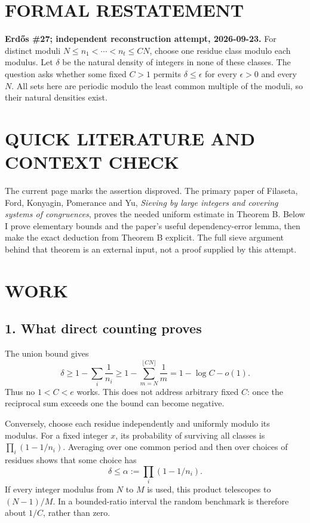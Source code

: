 \section{FORMAL RESTATEMENT}
\textbf{Erd\H{o}s \#27; independent reconstruction attempt, 2026-09-23.}
For distinct moduli $N\leq n_1<\cdots<n_t\leq CN$, choose one residue
class modulo each modulus. Let $\delta$ be the natural density of integers
in none of these classes. The question asks whether some fixed $C>1$
permits $\delta\leq\epsilon$ for every $\epsilon>0$ and every $N$.
All sets here are periodic modulo the least common multiple of the
moduli, so their natural densities exist.

\section{QUICK LITERATURE AND CONTEXT CHECK}
The current page marks the assertion disproved. The primary paper of
Filaseta, Ford, Konyagin, Pomerance and Yu, \emph{Sieving by large
integers and covering systems of congruences}, proves the needed
uniform estimate in Theorem B. Below I prove elementary bounds and the
paper's useful dependency-error lemma, then make the exact deduction
from Theorem B explicit. The full sieve argument behind that theorem
is an external input, not a proof supplied by this attempt.

\section{WORK}
\subsection{1. What direct counting proves}
The union bound gives
\[
 \delta\geq1-\sum_i\frac1{n_i}
 \geq1-\sum_{m=N}^{\lfloor CN\rfloor}\frac1m
 =1-\log C-o(1).
\]
Thus no $1<C<e$ works. This does not address arbitrary fixed $C$:
once the reciprocal sum exceeds one the bound can become negative.

Conversely, choose each residue independently and uniformly modulo its
modulus. For a fixed integer $x$, its probability of surviving all
classes is $\prod_i(1-1/n_i)$. Averaging over one common period and then
over choices of residues shows that some choice has
\[
 \delta\leq\alpha:=\prod_i(1-1/n_i).
\]
If every integer modulus from $N$ to $M$ is used, this product telescopes
to $(N-1)/M$. In a bounded-ratio interval the random benchmark is
therefore about $1/C$, rather than zero.

